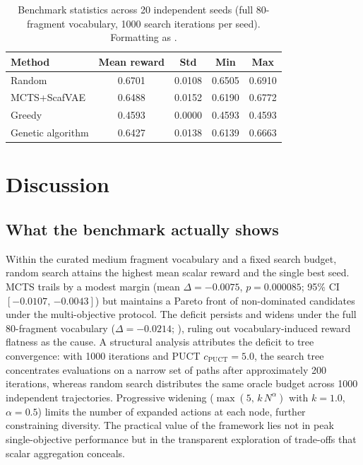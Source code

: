 \documentclass[10pt,a4paper]{article}
\begin{document}
\begin{table}[htbp]
  \centering
  \caption{Benchmark statistics across \num{20} independent seeds (full \num{80}-fragment vocabulary, \num{1000} search iterations per seed). Formatting as .}
  \label{tab:allfrag}
  \begin{tabular}{lcccc}
    \toprule
    Method & Mean reward & Std & Min & Max \\
    \midrule
    Random        & \num{0.6701} & \num{0.0108} & \num{0.6505} & \num{0.6910} \\
    MCTS+ScafVAE  & \num{0.6488} & \num{0.0152} & \num{0.6190} & \num{0.6772} \\
    Greedy        & \num{0.4593} & \num{0.0000} & \num{0.4593} & \num{0.4593} \\
    Genetic algorithm & \num{0.6427} & \num{0.0138} & \num{0.6139} & \num{0.6663} \\
    \bottomrule
  \end{tabular}
\end{table}

\section{Discussion}

\subsection{What the benchmark actually shows}

Within the curated medium fragment vocabulary and a fixed search budget, random search attains the highest mean scalar reward and the single best seed. MCTS trails by a modest margin (mean $\Delta = \num{-0.0075}$, $p = \num{0.000085}$; 95\% CI $[\num{-0.0107},\,\num{-0.0043}]$) but maintains a Pareto front of non-dominated candidates under the multi-objective protocol. The deficit persists and widens under the full \num{80}-fragment vocabulary ($\Delta = \num{-0.0214}$; ), ruling out vocabulary-induced reward flatness as the cause. A structural analysis attributes the deficit to tree convergence: with \num{1000} iterations and PUCT $c_{\text{PUCT}}=\num{5.0}$, the search tree concentrates evaluations on a narrow set of paths after approximately \num{200} iterations, whereas random search distributes the same oracle budget across \num{1000} independent trajectories. Progressive widening ($\max(5,\,k\,N^{\alpha})$ with $k=\num{1.0}$, $\alpha=\num{0.5}$) limits the number of expanded actions at each node, further constraining diversity. The practical value of the framework lies not in peak single-objective performance but in the transparent exploration of trade-offs that scalar aggregation conceals.
\end{document}
